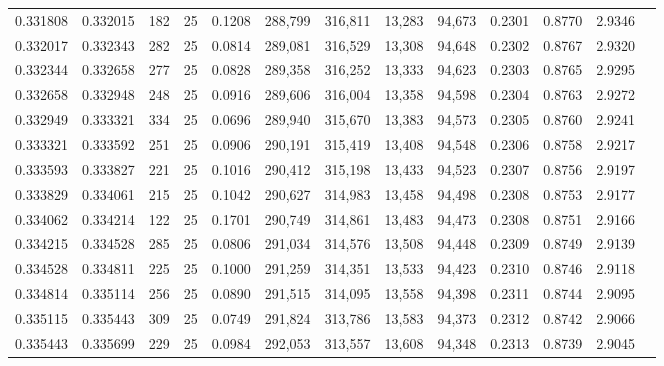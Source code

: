\begin{tabular}{rrrrrrrrrrrrr}
0.331808 & 0.332015 &   182 &  25 &                                     0.1208 & 288,799 & 316,811 &  13,283 &  94,673 & 0.2301 & 0.8770 & 2.9346 \\
0.332017 & 0.332343 &   282 &  25 &                                     0.0814 & 289,081 & 316,529 &  13,308 &  94,648 & 0.2302 & 0.8767 & 2.9320 \\
0.332344 & 0.332658 &   277 &  25 &                                     0.0828 & 289,358 & 316,252 &  13,333 &  94,623 & 0.2303 & 0.8765 & 2.9295 \\
0.332658 & 0.332948 &   248 &  25 &                                     0.0916 & 289,606 & 316,004 &  13,358 &  94,598 & 0.2304 & 0.8763 & 2.9272 \\
0.332949 & 0.333321 &   334 &  25 &                                     0.0696 & 289,940 & 315,670 &  13,383 &  94,573 & 0.2305 & 0.8760 & 2.9241 \\
0.333321 & 0.333592 &   251 &  25 &                                     0.0906 & 290,191 & 315,419 &  13,408 &  94,548 & 0.2306 & 0.8758 & 2.9217 \\
0.333593 & 0.333827 &   221 &  25 &                                     0.1016 & 290,412 & 315,198 &  13,433 &  94,523 & 0.2307 & 0.8756 & 2.9197 \\
0.333829 & 0.334061 &   215 &  25 &                                     0.1042 & 290,627 & 314,983 &  13,458 &  94,498 & 0.2308 & 0.8753 & 2.9177 \\
0.334062 & 0.334214 &   122 &  25 &                                     0.1701 & 290,749 & 314,861 &  13,483 &  94,473 & 0.2308 & 0.8751 & 2.9166 \\
0.334215 & 0.334528 &   285 &  25 &                                     0.0806 & 291,034 & 314,576 &  13,508 &  94,448 & 0.2309 & 0.8749 & 2.9139 \\
0.334528 & 0.334811 &   225 &  25 &                                     0.1000 & 291,259 & 314,351 &  13,533 &  94,423 & 0.2310 & 0.8746 & 2.9118 \\
0.334814 & 0.335114 &   256 &  25 &                                     0.0890 & 291,515 & 314,095 &  13,558 &  94,398 & 0.2311 & 0.8744 & 2.9095 \\
0.335115 & 0.335443 &   309 &  25 &                                     0.0749 & 291,824 & 313,786 &  13,583 &  94,373 & 0.2312 & 0.8742 & 2.9066 \\
0.335443 & 0.335699 &   229 &  25 &                                     0.0984 & 292,053 & 313,557 &  13,608 &  94,348 & 0.2313 & 0.8739 & 2.9045 \\

\end{tabular}
